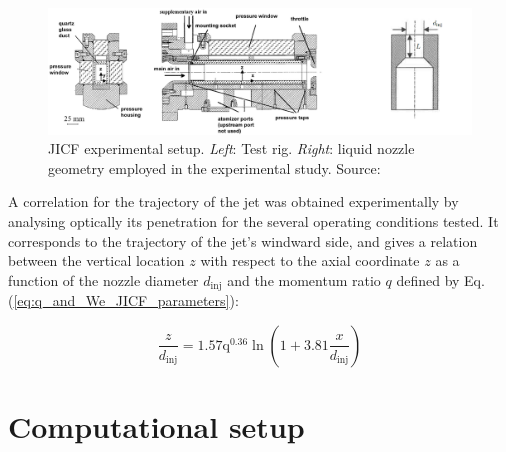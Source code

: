 \begin{figure}[h!]
	\centering
	\includegraphics[scale=0.35]{./part2_developments/figures_ch5_resolved_JICF/experiment_JICF_DLR}
	\caption[JICF experimental setup]{JICF experimental setup. \textsl{Left}: Test rig. \textsl{Right}: liquid nozzle geometry employed in the experimental study. Source: }
	\label{fig:experiment_JICF_DLR}
\end{figure}


A correlation for the trajectory of the jet was obtained experimentally by analysing optically its penetration for the several operating conditions tested. It corresponds to the trajectory of the jet's windward side, and gives a relation between the vertical location $z$ with respect to the axial coordinate $z$ as a function of the nozzle diameter $d_\mathrm{inj}$ and the momentum ratio $q$ defined by Eq. (\ref{eq:q_and_We_JICF_parameters}): %

\begin{equation}
    \label{eq:jicf_trajectory_becker}
    \frac{z}{d_\mathrm{inj}} = 1.57 \mathrm{q}^{0.36} \ln \left( 1 + 3.81 \frac{x}{d_\mathrm{inj}} \right)
\end{equation}



\section{Computational setup}
	\label{sec:computational_setup}


